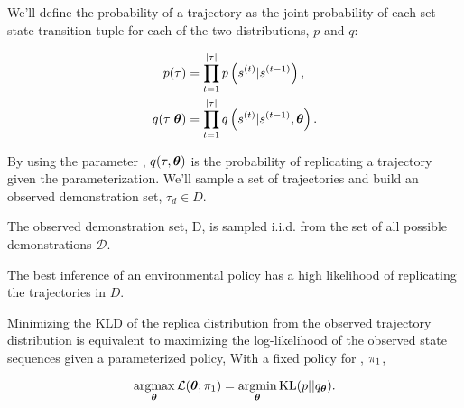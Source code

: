     We'll define the probability of a trajectory as the joint probability of each set state-transition tuple for each of
    the two distributions, $p$ and $q$:

    \begin{align*}
            p(\tau) &= \prod_{t=1}^{|\tau|}p\left( s^{(t)}| s^{(t-1)} \right), \\
            q(\tau|\boldsymbol{\mathbb{\theta}}) &= \prod_{t=1}^{|\tau|}q\left(s^{(t)}| s^{(t-1)}, \boldsymbol{\mathbb{\theta}}\right).
    \end{align*}

    \noindent
    By using the parameter \paramVec, $q(\tau,\boldsymbol{\mathbb{\theta}})$ is the probability of replicating a trajectory given the
    parameterization. We'll sample a set of trajectories and build an observed demonstration set, $\tau_d \in D$.

    \begin{assumption}
        The observed demonstration set, D, is sampled i.i.d. from the set of all possible demonstrations $\mathcal{D}$.
    \end{assumption}

    The best inference of an environmental policy has a high likelihood of replicating the trajectories in $D$.
    \begin{lemma}\label{lemma:obj_fun_equiv}
        Minimizing the \ac{KLD} of the replica distribution from the observed trajectory distribution is equivalent to
        maximizing the log-likelihood of the observed state sequences given a parameterized policy, With a fixed policy
        for , $\pi_{1}$,

        \begin{equation*}
            \mathop{\mathrm{argmax}}_{\boldsymbol{\mathbb{\theta}}} \mathcal{L}(\boldsymbol{\mathbb{\theta}}; \pi_{1}) = \mathop{\mathrm{argmin}}_{\boldsymbol{\mathbb{\theta}}} \text{KL}(p||q_{\boldsymbol{\mathbb{\theta}}}).
        \end{equation*}
    \end{lemma}

